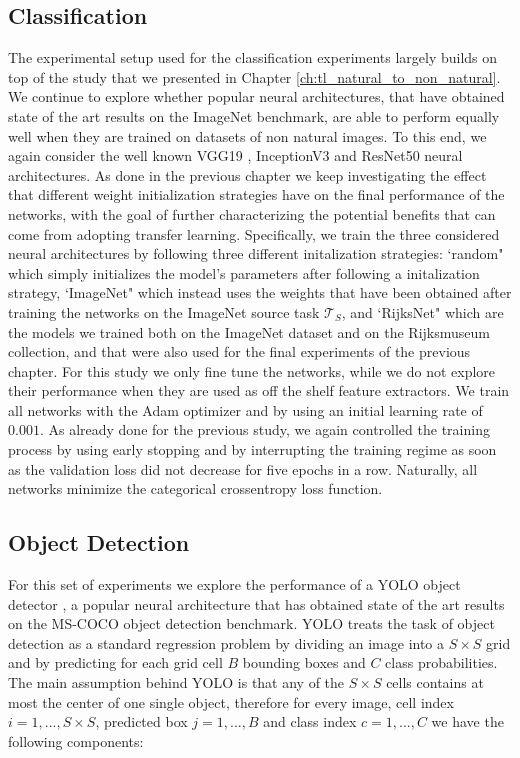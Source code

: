 \subsection{Classification}
The experimental setup used for the classification experiments largely builds on top of the study that we presented in Chapter \ref{ch:tl_natural_to_non_natural}. We continue to explore whether popular neural architectures, that have obtained state of the art results on the ImageNet benchmark, are able to perform equally well when they are trained on datasets of non natural images. To this end, we again consider the well known VGG19 \cite{simonyan2014very}, InceptionV3 \cite{szegedy2016rethinking} and ResNet50 \cite{xie2017aggregated} neural architectures. As done in the previous chapter we keep investigating the effect that different weight initialization strategies have on the final performance of the networks, with the goal of further characterizing the potential benefits that can come from adopting transfer learning. Specifically, we train the three considered neural architectures by following three different initalization strategies: `random" which simply initializes the model's parameters after following a initalization strategy, `ImageNet" which instead uses the weights that have been obtained after training the networks on the ImageNet source task $\mathcal{T}_S$, and `RijksNet" which are the models we trained both on the ImageNet dataset and on the Rijksmuseum collection, and that were also used for the final experiments of the previous chapter. For this study we only fine tune the networks, while we do not explore their performance when they are used as off the shelf feature extractors. We train all networks with the Adam optimizer \cite{kingma2014adam} and by using an initial learning rate of $0.001$. As already done for the previous study, we again controlled the training process by using early stopping and by interrupting the training regime as soon as the validation loss did not decrease for five epochs in a row. Naturally, all networks minimize the categorical crossentropy loss function.

\subsection{Object Detection}

For this set of experiments we explore the performance of a YOLO object detector \cite{}, a popular neural architecture that has obtained state of the art results on the MS-COCO object detection benchmark. YOLO treats the task of object detection as a standard regression problem by dividing an image into a $S\times S$ grid and by predicting for each grid cell $B$ bounding boxes and $C$ class probabilities. The main assumption behind YOLO is that any of the $S\times S$ cells contains at most the center of one single object, therefore for every image, cell index $i=1,...,S\times S$, predicted box $j=1,...,B$ and class index $c=1,...,C$ we have the following components: 

